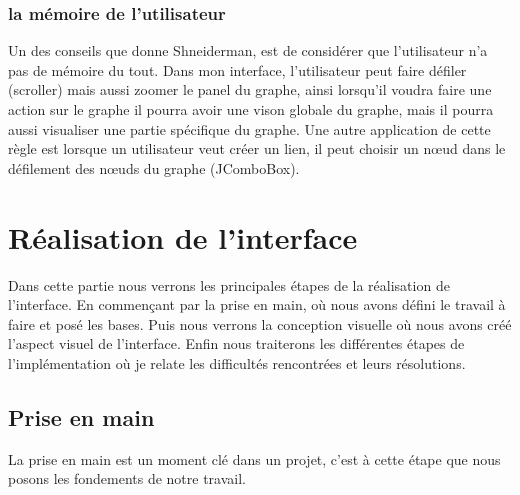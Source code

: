 \documentclass[french]{article}
\begin{document}
  \subsubsection{la mémoire de l'utilisateur }

    Un des conseils que donne Shneiderman, est de considérer que l'utilisateur n'a pas de mémoire du tout. Dans mon interface, l'utilisateur peut faire défiler (scroller) mais aussi zoomer le panel du graphe, ainsi lorsqu'il voudra faire une action sur le graphe il pourra avoir une vison globale du graphe, mais il pourra aussi visualiser une partie spécifique du graphe. Une autre application de cette règle est lorsque un utilisateur veut créer un lien, il peut choisir un nœud dans le  défilement des nœuds du graphe (JComboBox).


\section{Réalisation de l'interface}\label{part_Realisation}

Dans cette partie nous verrons les principales étapes de la réalisation de l'interface. En commençant par la prise en main, où nous avons défini le travail à faire et posé les bases. Puis nous verrons la conception visuelle où nous avons créé l'aspect visuel de l'interface. Enfin nous traiterons les différentes étapes de l'implémentation où je relate les difficultés rencontrées et leurs résolutions. 

	\subsection{Prise en main}

  La prise en main est un moment clé dans un projet, c'est à cette étape que nous posons les fondements de notre travail.
  
\end{document}

